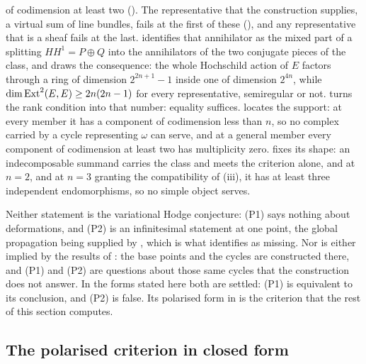 \begin{remark}
\begin{enumerate}[label=\textup{(P\arabic*)},leftmargin=*]
  of codimension at least two (). The representative that
  the construction supplies, a virtual sum of line bundles, fails at the first
  of these (\cite[Proposition~9.10]{paperI}), and any representative that is a
  sheaf fails at the last.  identifies that
  annihilator as the mixed part of a splitting $HH^{1}=P\oplus Q$ into the
  annihilators of the two conjugate pieces of the class, and
   draws the consequence: the whole Hochschild action of
  $E$ factors through a ring of dimension $2^{2n+1}-1$ inside one of
  dimension $2^{4n}$, while $\dim\operatorname{Ext}^{2}(E,E)\ge2n(2n-1)$ for every
  representative, semiregular or not.  turns the rank
  condition into that number: equality suffices.  locates
  the support: at every member it has a component of codimension less than
  $n$, so no complex carried by a cycle representing $\omega$ can serve, and
  at a general member every component of codimension at least two has
  multiplicity zero.
   fixes its shape: an indecomposable summand carries the
  class and meets the criterion alone, and at $n=2$, and at $n=3$ granting
  the compatibility of (iii), it has at least three
  independent endomorphisms, so no simple object serves.
\end{enumerate}

Neither statement is the variational Hodge conjecture: (P1) says nothing
about deformations, and (P2) is an infinitesimal statement at one point, the
global propagation being supplied by \cite[Theorem~16.4]{paperI}, which is what
\cite[Remark~B.11]{paperI} identifies as missing. Nor is either implied by the
results of \cite[Section~15.5]{paperI}: the base points and the cycles are
constructed there, and (P1) and (P2) are questions about those same cycles
that the construction does not answer. In the forms stated here both are
settled: (P1) is equivalent to its conclusion, and (P2) is false. Its
polarised form in  is the criterion that the rest of this
section computes.
\end{remark}

\subsection{The polarised criterion in closed form}

